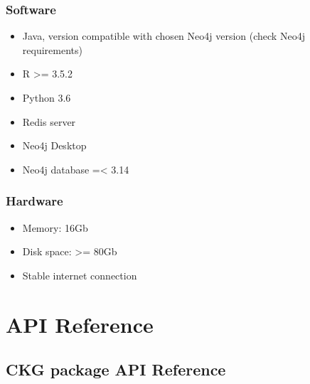 \documentclass[letterpaper,10pt,english]{sphinxmanual}
\begin{document}
\subsection{Software}
\label{\detokenize{system_requirements:software}}\begin{itemize}
\item {} 
Java, version compatible with chosen Neo4j version (check Neo4j requirements)

\item {} 
R \textgreater{}= 3.5.2

\item {} 
Python 3.6

\item {} 
Redis server

\item {} 
Neo4j Desktop

\item {} 
Neo4j database =\textless{} 3.14

\end{itemize}


\subsection{Hardware}
\label{\detokenize{system_requirements:hardware}}\begin{itemize}
\item {} 
Memory: 16Gb

\item {} 
Disk space: \textgreater{}= 80Gb

\item {} 
Stable internet connection

\end{itemize}


\chapter{API Reference}
\label{\detokenize{index:api-reference}}

\section{CKG package API Reference}
\label{\detokenize{src:ckg-package-api-reference}}\label{\detokenize{src::doc}}
\end{document}
